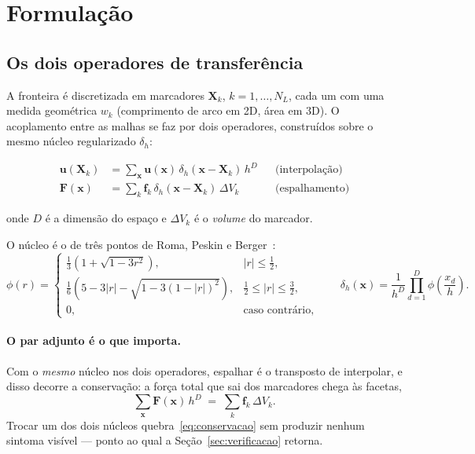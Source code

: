 \section{Formulação}
\label{sec:formulacao}

\subsection{Os dois operadores de transferência}

A fronteira é discretizada em marcadores $\mathbf{X}_k$, $k = 1,\dots,N_L$, cada
um com uma medida geométrica $w_k$ (comprimento de arco em 2D, área em 3D). O
acoplamento entre as malhas se faz por dois operadores, construídos sobre o mesmo
núcleo regularizado $\delta_h$:

\begin{align}
  \mathbf{u}(\mathbf{X}_k) &= \sum_{\mathbf{x}} \mathbf{u}(\mathbf{x})\,
      \delta_h(\mathbf{x}-\mathbf{X}_k)\, h^{D}
      && \text{(interpolação)} \label{eq:interp}\\
  \mathbf{F}(\mathbf{x}) &= \sum_{k} \mathbf{f}_k\,
      \delta_h(\mathbf{x}-\mathbf{X}_k)\, \Delta V_k
      && \text{(espalhamento)} \label{eq:espalha}
\end{align}

onde $D$ é a dimensão do espaço e $\Delta V_k$ é o \emph{volume} do marcador.

O núcleo é o de três pontos de Roma, Peskin e Berger~\cite{roma1999}:
\begin{equation}
  \phi(r) =
  \begin{cases}
    \tfrac{1}{3}\left(1 + \sqrt{1-3r^2}\right), & |r| \le \tfrac{1}{2},\\[4pt]
    \tfrac{1}{6}\left(5 - 3|r| - \sqrt{1-3(1-|r|)^2}\right),
      & \tfrac{1}{2} \le |r| \le \tfrac{3}{2},\\[4pt]
    0, & \text{caso contrário,}
  \end{cases}
  \qquad
  \delta_h(\mathbf{x}) = \frac{1}{h^{D}}\prod_{d=1}^{D}\phi\!\left(\frac{x_d}{h}\right).
\end{equation}

\paragraph{O par adjunto é o que importa.} Com o \emph{mesmo} núcleo nos dois
operadores, espalhar é o transposto de interpolar, e disso decorre a conservação:
a força total que sai dos marcadores chega às facetas,
\begin{equation}
  \sum_{\mathbf{x}} \mathbf{F}(\mathbf{x})\,h^{D}
  \;=\; \sum_k \mathbf{f}_k \,\Delta V_k .
  \label{eq:conservacao}
\end{equation}
Trocar um dos dois núcleos quebra~\eqref{eq:conservacao} sem produzir nenhum
sintoma visível --- ponto ao qual a Seção~\ref{sec:verificacao} retorna.


